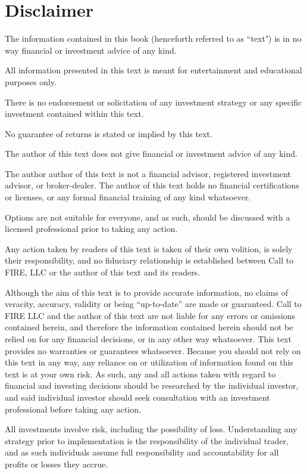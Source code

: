 

\chapter*{Disclaimer}\label{Disclaimer}


The information contained in this book (henceforth referred to as “text") is in no way financial or investment advice of any kind. 

All information presented in this text is meant for entertainment and educational purposes only. 

There is no endorsement or solicitation of any investment strategy or any specific investment contained within this text. 

No guarantee of returns is stated or implied by this text.

The author of this text does not give financial or investment advice of any kind.

The author author of this text is not a financial advisor, registered investment advisor, or broker-dealer. The author of this text holds no financial certifications or licenses, or any formal financial training of any kind whatsoever. 

Options are not suitable for everyone, and as such, should be discussed with a licensed professional prior to taking any action.

Any action taken by readers of this text is taken of their own volition, is solely their responsibility, and no fiduciary relationship is established between Call to FIRE, LLC or the author of this text and its readers. 

Although the aim of this text is to provide accurate information, no claims of veracity, accuracy, validity or being “up-to-date” are made or guaranteed. Call to FIRE LLC and the author of this text are not liable for any errors or omissions contained herein, and therefore the information contained herein should not be relied on for any financial decisions, or in any other way whatsoever. This text provides no warranties or guarantees whatsoever. Because you should not rely on this text in any way, any reliance on or utilization of information found on this text is at your own risk. As such, any and all actions taken with regard to financial and investing decisions should be researched by the individual investor, and said individual investor should seek consultation with an investment professional before taking any action.

All investments involve risk, including the possibility of loss. Understanding any strategy prior to implementation is the responsibility of the individual trader, and as such individuals assume full responsibility and accountability for all profits or losses they accrue. 

